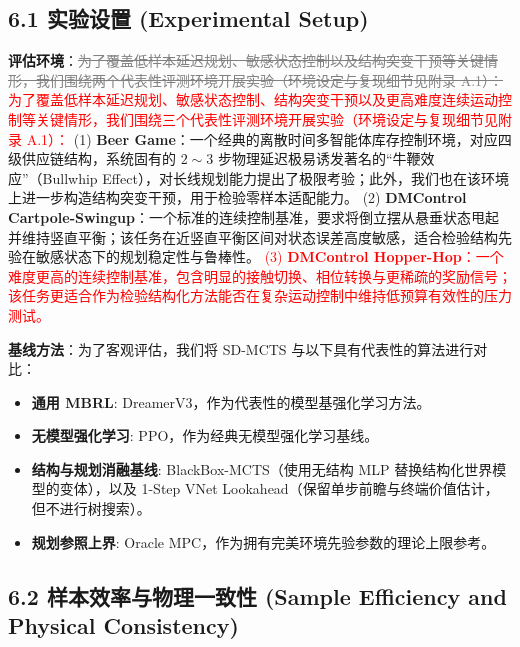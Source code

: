 \documentclass[UTF8]{ctexart}
\newcommand{\revadd}[1]{\textcolor{red}{#1}}
\newcommand{\revdel}[1]{\textcolor{gray}{\sout{#1}}}
\begin{document}
\hypertarget{ux5b9eux9a8cux8bbeux7f6e-experimental-setup}{%
\subsection{6.1 实验设置 (Experimental
Setup)}\label{ux5b9eux9a8cux8bbeux7f6e-experimental-setup}}

\textbf{评估环境}：\revdel{为了覆盖低样本延迟规划、敏感状态控制以及结构突变干预等关键情形，我们围绕两个代表性评测环境开展实验（环境设定与复现细节见附录
A.1）：}
\revadd{为了覆盖低样本延迟规划、敏感状态控制、结构突变干预以及更高难度连续运动控制等关键情形，我们围绕三个代表性评测环境开展实验（环境设定与复现细节见附录
A.1）：} 
(1) \textbf{Beer Game}：一个经典的离散时间多智能体库存控制环境，对应四级供应链结构，系统固有的
$2 \sim 3$ 步物理延迟极易诱发著名的“牛鞭效应”（Bullwhip Effect），对长线规划能力提出了极限考验；此外，我们也在该环境上进一步构造结构突变干预，用于检验零样本适配能力。 
(2) \textbf{DMControl Cartpole-Swingup}：一个标准的连续控制基准，要求将倒立摆从悬垂状态甩起并维持竖直平衡；该任务在近竖直平衡区间对状态误差高度敏感，适合检验结构先验在敏感状态下的规划稳定性与鲁棒性。
\revadd{(3) \textbf{DMControl Hopper-Hop}：一个难度更高的连续控制基准，包含明显的接触切换、相位转换与更稀疏的奖励信号；该任务更适合作为检验结构化方法能否在复杂运动控制中维持低预算有效性的压力测试。}

\textbf{基线方法}：为了客观评估，我们将 SD-MCTS 与以下具有代表性的算法进行对比：

\begin{itemize}
\item \textbf{通用 MBRL}: DreamerV3，作为代表性的模型基强化学习方法。
\item \textbf{无模型强化学习}: PPO，作为经典无模型强化学习基线。
\item \textbf{结构与规划消融基线}: BlackBox-MCTS（使用无结构 MLP 替换结构化世界模型的变体），以及 1-Step VNet Lookahead（保留单步前瞻与终端价值估计，但不进行树搜索）。
\item \textbf{规划参照上界}: Oracle MPC，作为拥有完美环境先验参数的理论上限参考。
\end{itemize}

\hypertarget{ux6837ux672cux6548ux7387ux4e0eux7269ux7406ux4e00ux81f4ux6027-sample-efficiency-and-physical-consistency}{%
\subsection{6.2 样本效率与物理一致性 (Sample Efficiency and Physical
Consistency)}\label{ux6837ux672cux6548ux7387ux4e0eux7269ux7406ux4e00ux81f4ux6027-sample-efficiency-and-physical-consistency}}
\end{document}
